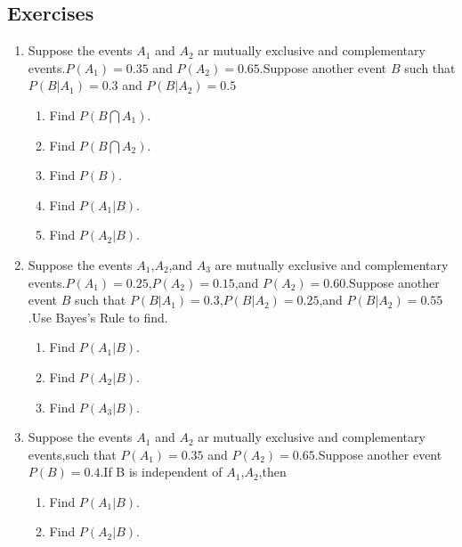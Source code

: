 

\subsection{Exercises}
\begin{enumerate}
\item Suppose the events $A_1$ and $A_2$ ar mutually exclusive and complementary events.$P(A_1)=0.35$ and $P(A_2)=0.65$.Suppose another event $B$ such that $P(B|A_1)=0.3$ and $P(B|A_2)=0.5$

\begin{enumerate}
\item Find $P(B\bigcap A_1)$.
\item Find $P(B\bigcap A_2)$.
\item Find $P(B)$.
\item Find $P(A_1|B)$.
\item Find $P(A_2|B)$.
\end{enumerate}


\item Suppose the events $A_1$,$A_2$,and $A_3$ are mutually exclusive and complementary events.$P(A_1)=0.25$,$P(A_2)=0.15$,and $P(A_2)=0.60$.Suppose another event $B$ such that $P(B|A_1)=0.3$,$P(B|A_2)=0.25$,and $P(B|A_2)=0.55$.Use Bayes's Rule to find.
\begin{enumerate}
\item Find $P(A_1|B)$.
\item Find $P(A_2|B)$.
\item Find $P(A_3|B)$.
\end{enumerate}

\item Suppose the events $A_1$ and $A_2$ ar mutually exclusive and complementary events,such that $P(A_1)=0.35$ and $P(A_2)=0.65$.Suppose another event $P(B)=0.4$.If B is independent of $A_1$,$A_2$,then 

\begin{enumerate}
\item Find $P(A_1|B)$.
\item Find $P(A_2|B)$.
\end{enumerate}



\end{enumerate}



%
%
%
%
%
%
